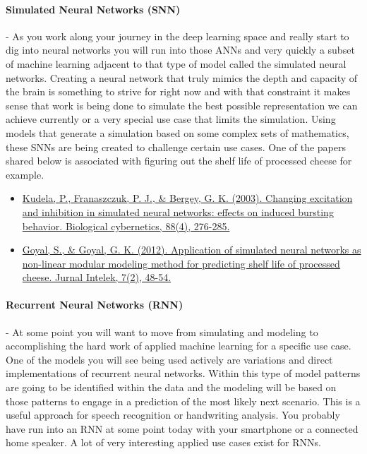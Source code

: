 \documentclass{article}
\begin{document}
\paragraph{Simulated Neural Networks (SNN)} - As you work along your journey in the deep learning space and really start to dig into neural networks you will run into those ANNs and very quickly a subset of machine learning adjacent to that type of model called the simulated neural networks. Creating a neural network that truly mimics the depth and capacity of the brain is something to strive for right now and with that constraint it makes sense that work is being done to simulate the best possible representation we can achieve currently or a very special use case that limits the simulation. Using models that generate a simulation based on some complex sets of mathematics, these SNNs are being created to challenge certain use cases. One of the papers shared below is associated with figuring out the shelf life of processed cheese for example. 

\begin{itemize}
\item \href{https://citeseerx.ist.psu.edu/viewdoc/download?doi=10.1.1.57.9281&rep=rep1&type=pdf}{Kudela, P., Franaszczuk, P. J., \& Bergey, G. K. (2003). Changing excitation and inhibition in simulated neural networks: effects on induced bursting behavior. Biological cybernetics, 88(4), 276-285.} \cite{kudela2003changing}
\item \href{https://ir.uitm.edu.my/id/eprint/34381/1/34381.pdf}{Goyal, S., \& Goyal, G. K. (2012). Application of simulated neural networks as non-linear modular modeling method for predicting shelf life of processed cheese. Jurnal Intelek, 7(2), 48-54.} \cite{goyal2012application}
\end{itemize}

\paragraph{Recurrent Neural Networks (RNN)} - At some point you will want to move from simulating and modeling to accomplishing the hard work of applied machine learning for a specific use case. One of the models you will see being used actively are variations and direct implementations of recurrent neural networks. Within this type of model patterns are going to be identified within the data and the modeling will be based on those patterns to engage in a prediction of the most likely next scenario. This is a useful approach for speech recognition or handwriting analysis. You probably have run into an RNN at some point today with your smartphone or a connected home speaker. A lot of very interesting applied use cases exist for RNNs.
\end{document}
